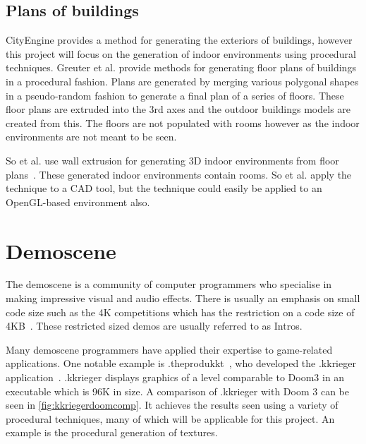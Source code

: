\documentclass[12pt]{article}
\begin{document}
\subsection{Plans of buildings}
CityEngine provides a method for generating the exteriors of buildings, however this project will focus on the generation of indoor environments using procedural techniques.
Greuter et al. provide methods for generating\cite{greuter2003real} floor plans of buildings in a procedural fashion.
Plans are generated by merging various polygonal shapes in a pseudo-random fashion to generate a final plan of a series of floors.
These floor plans are extruded into the 3rd axes and the outdoor buildings models are created from this.
The floors are not populated with rooms however as the indoor environments are not meant to be seen.

So et al. use wall extrusion for generating 3D indoor environments from floor plans~\cite{so1998reconstruction}.
These generated indoor environments contain rooms.
So et al. apply the technique to a CAD tool, but the technique could easily be applied to an OpenGL-based environment also.

\section{Demoscene}
The demoscene is a community of computer programmers who specialise in making impressive visual and audio effects.
There is usually an emphasis on small code size such as the 4K competitions which has the restriction on a code size of 4KB~\cite{web:demoscene4k}.
These restricted sized demos are usually referred to as Intros.

Many demoscene programmers have applied their expertise to game-related applications.
One notable example is .theprodukkt~\cite{web:theprodukkt}, who developed the .kkrieger application~\cite{web:kkrieger}.
.kkrieger displays graphics of a level comparable to Doom3 in an executable which is 96K in size.
A comparison of .kkrieger with Doom 3 can be seen in \ref{fig:kkriegerdoomcomp}.
It achieves the results seen using a variety of procedural techniques, many of which will be applicable for this project.
An example is the procedural generation of textures.
\end{document}
